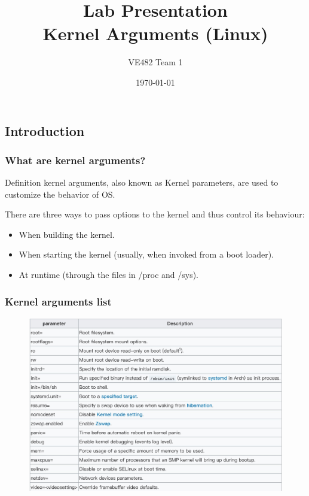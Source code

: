 \documentclass{beamer}
\title{Lab Presentation \\Kernel Arguments (Linux)}
\author{VE482 Team 1}
\institute{UM-SJTU Joint Institute}
\date{\today}
\begin{document}
\begin{frame}
	\titlepage
\end{frame}

\begin{frame}
	\tableofcontents
\end{frame}

\begin{frame}
	\section{Introduction}
	\frametitle{What are kernel arguments?}
	
	\begin{block}{Definition}
		{\color{blue} kernel arguments}, also known as Kernel parameters, are used to customize the behavior of OS.
	\end{block}
	
	There are three ways to pass options to the kernel and thus control its behaviour:
	\begin{itemize}
	    \item When building the kernel. 
\item When starting the kernel (usually, when invoked from a boot loader).
\item At runtime (through the files in /proc and /sys). 
	\end{itemize}
\end{frame}

\begin{frame}
\frametitle{Kernel arguments list}
\begin{figure}[H]
    \centering
    \includegraphics[width=\textwidth]{1.jpg}
\end{figure}
    
\end{frame}
\end{document}
